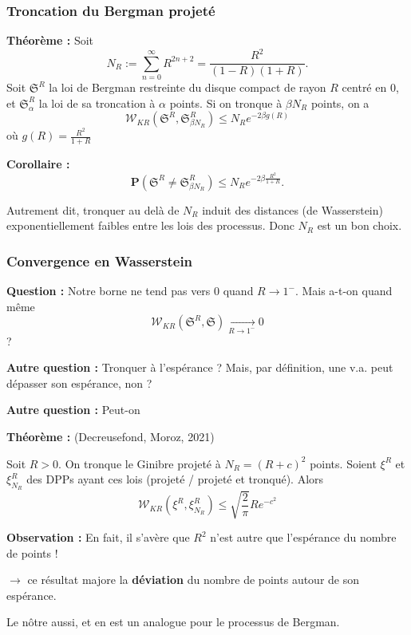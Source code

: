 \documentclass{beamer}
\begin{document}
\begin{frame}
\end{frame}\begin{frame}\frametitle{Troncation du Bergman projeté}

    \textbf{Théorème :} Soit
    \[
    N_R := \sum_{n=0}^\infty R^{2n+2} = \frac{R^2}{(1-R)(1+R)}.
    \]
    Soit $\mathfrak{S}^R$ la loi de Bergman restreinte du disque compact de rayon $R$ centré en $0$, et $\mathfrak{S}_\alpha^R$ la loi de sa troncation à $\alpha$ points. Si on tronque à $\beta N_R$ points, on a
    \[
        \mathcal{W}_{KR}(\mathfrak{S}^R, \mathfrak{S}_{\beta N_R}^R) \leqslant N_R e^{-2\beta g(R)}
    \]
    où $ g(R) = \frac{R^2}{1+R} $

    \textbf{Corollaire :}
    \[
    \mathbf{P}(\mathfrak{S}^R \neq \mathfrak{S}_{\beta N_R}^R) \leqslant N_R e^{-2\beta \frac{R^2}{1+R}}.
    \]

    Autrement dit, tronquer au delà de $ N_R $ induit des distances (de Wasserstein) exponentiellement faibles entre les lois des processus. Donc $ N_R $ est un bon choix.

\end{frame}\begin{frame}\frametitle{Convergence en Wasserstein}

    \textbf{Question :} Notre borne ne tend pas vers $0$ quand $ R \to 1^-$. Mais a-t-on quand même 
    \[ 
        \mathcal W_{KR} ( \mathfrak S^R, \mathfrak S) \xrightarrow[R \to 1^-]{} 0
    \] ?

    \textbf{Autre question :} Tronquer à l'espérance ? Mais, par définition, une v.a. peut dépasser son espérance, non ?

    \textbf{Autre question :} Peut-on

    \textbf{Théorème :} (Decreusefond, Moroz, 2021)
    
    Soit $R > 0$. On tronque le Ginibre projeté à $ N_R = (R+c)^2 $ points. Soient $ \xi^R $ et $ \xi^R_{N_R} $ des DPPs ayant ces lois (projeté / projeté et tronqué). Alors
    \[
         \mathcal W_{KR}(\xi^R, \xi^R_{N_R}) \leqslant \sqrt{\frac{2}{\pi}} R e^{-c^2}
    \]

    \textbf{Observation :} En fait, il s'avère que $ R^2 $ n'est autre que l'espérance du nombre de points !

    \begin{center}

    $ \rightarrow $ ce résultat majore la \textbf{déviation} du nombre de points autour de son espérance. 

    Le nôtre aussi, et en est un analogue pour le processus de Bergman.


\end{center}
\end{frame}
\end{document}
